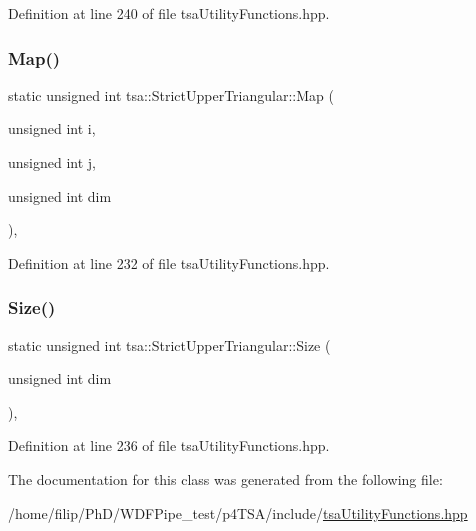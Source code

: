 Definition at line 240 of file tsa\+Utility\+Functions.\+hpp.

\mbox{\label{classtsa_1_1_strict_upper_triangular_a181559cdcde4660621e9c4d593cdb91b}} 
\subsubsection{\texorpdfstring{Map()}{Map()}}
{\footnotesize\ttfamily static unsigned int tsa\+::\+Strict\+Upper\+Triangular\+::\+Map (\begin{DoxyParamCaption}\item[{unsigned int}]{i,  }\item[{unsigned int}]{j,  }\item[{unsigned int}]{dim }\end{DoxyParamCaption})\hspace{0.3cm}{\ttfamily [inline]}, {\ttfamily [static]}}



Definition at line 232 of file tsa\+Utility\+Functions.\+hpp.

\mbox{\label{classtsa_1_1_strict_upper_triangular_a07caedb4fa38d3e286e392633c7c8d51}} 
\subsubsection{\texorpdfstring{Size()}{Size()}}
{\footnotesize\ttfamily static unsigned int tsa\+::\+Strict\+Upper\+Triangular\+::\+Size (\begin{DoxyParamCaption}\item[{unsigned int}]{dim }\end{DoxyParamCaption})\hspace{0.3cm}{\ttfamily [inline]}, {\ttfamily [static]}}



Definition at line 236 of file tsa\+Utility\+Functions.\+hpp.



The documentation for this class was generated from the following file\+:\begin{DoxyCompactItemize}
\item 
/home/filip/\+Ph\+D/\+W\+D\+F\+Pipe\+\_\+test/p4\+T\+S\+A/include/\hyperlink{tsa_utility_functions_8hpp}{tsa\+Utility\+Functions.\+hpp}\end{DoxyCompactItemize}
